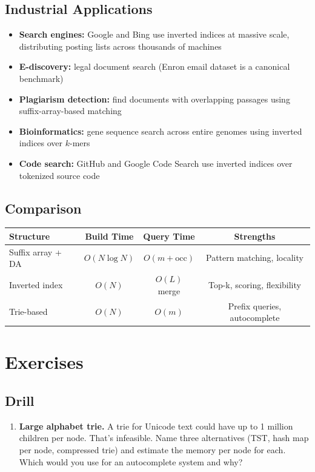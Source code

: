 \subsection{Industrial Applications}

\begin{itemize}
    \item \textbf{Search engines:} Google and Bing use inverted indices at massive scale, distributing posting lists across thousands of machines
    \item \textbf{E-discovery:} legal document search (Enron email dataset is a canonical benchmark)
    \item \textbf{Plagiarism detection:} find documents with overlapping passages using suffix-array-based matching
    \item \textbf{Bioinformatics:} gene sequence search across entire genomes using inverted indices over $k$-mers
    \item \textbf{Code search:} GitHub and Google Code Search use inverted indices over tokenized source code
\end{itemize}

\subsection{Comparison}

\begin{center}
\begin{tabular}{lccc}
\toprule
Structure & Build Time & Query Time & Strengths \\
\midrule
Suffix array + DA & $O(N \log N)$ & $O(m + \text{occ})$ & Pattern matching, locality \\
Inverted index & $O(N)$ & $O(L)$ merge & Top-k, scoring, flexibility \\
Trie-based & $O(N)$ & $O(m)$ & Prefix queries, autocomplete \\
\bottomrule
\end{tabular}
\end{center}

\section{Exercises}

\subsection{Drill}

\begin{enumerate}
\item \textbf{Large alphabet trie.} A trie for Unicode text could have up to 1 million children per node. That's infeasible. Name three alternatives (TST, hash map per node, compressed trie) and estimate the memory per node for each. Which would you use for an autocomplete system and why?
\end{enumerate}

